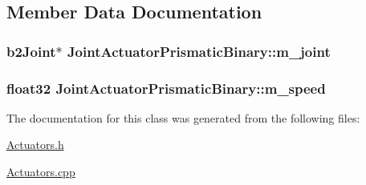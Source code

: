 \subsection{Member Data Documentation}
\hypertarget{classJointActuatorPrismaticBinary_acfe11f8fb117fa9257067367fcf9a8bc}{
\subsubsection[{m\-\_\-joint}]{\setlength{\rightskip}{0pt plus 5cm}b2\-Joint$\ast$ Joint\-Actuator\-Prismatic\-Binary\-::m\-\_\-joint}}\label{classJointActuatorPrismaticBinary_acfe11f8fb117fa9257067367fcf9a8bc}
\hypertarget{classJointActuatorPrismaticBinary_aeeaabbbb710800d517ddfa34c7c68ded}{
\subsubsection[{m\-\_\-speed}]{\setlength{\rightskip}{0pt plus 5cm}float32 Joint\-Actuator\-Prismatic\-Binary\-::m\-\_\-speed}}\label{classJointActuatorPrismaticBinary_aeeaabbbb710800d517ddfa34c7c68ded}


The documentation for this class was generated from the following files\-:\begin{DoxyCompactItemize}
\item 
\hyperlink{Actuators_8h}{Actuators.\-h}\item 
\hyperlink{Actuators_8cpp}{Actuators.\-cpp}\end{DoxyCompactItemize}
